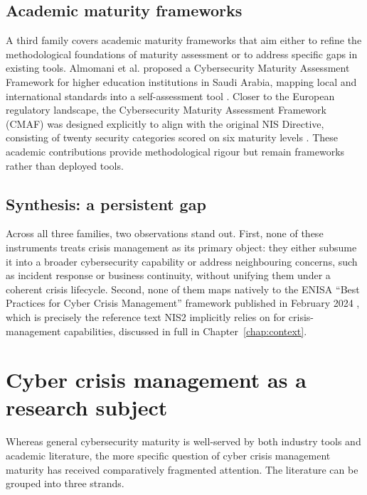 \subsection{Academic maturity frameworks}
\label{sec:soa-academic-frameworks}

A third family covers academic maturity frameworks that aim either to refine the methodological foundations of maturity assessment or to address specific gaps in existing tools. Almomani et al. proposed a Cybersecurity Maturity Assessment Framework for higher education institutions in Saudi Arabia, mapping local and international standards into a self-assessment tool \cite{almomani2021cybersecurity}. Closer to the European regulatory landscape, the Cybersecurity Maturity Assessment Framework (CMAF) was designed explicitly to align with the original NIS Directive, consisting of twenty security categories scored on six maturity levels \cite{drivas2020nis}. These academic contributions provide methodological rigour but remain frameworks rather than deployed tools.

\subsection{Synthesis: a persistent gap}
\label{sec:soa-maturity-gap}

Across all three families, two observations stand out. First, none of these instruments treats crisis management as its primary object: they either subsume it into a broader cybersecurity capability or address neighbouring concerns, such as incident response or business continuity, without unifying them under a coherent crisis lifecycle. Second, none of them maps natively to the ENISA ``Best Practices for Cyber Crisis Management'' framework published in February 2024 \cite{enisa_crisis_mgmt_2024}, which is precisely the reference text NIS2 implicitly relies on for crisis-management capabilities, discussed in full in Chapter~\ref{chap:context}.

\section{Cyber crisis management as a research subject}

Whereas general cybersecurity maturity is well-served by both industry tools and academic literature, the more specific question of cyber crisis management maturity has received comparatively fragmented attention. The literature can be grouped into three strands.

